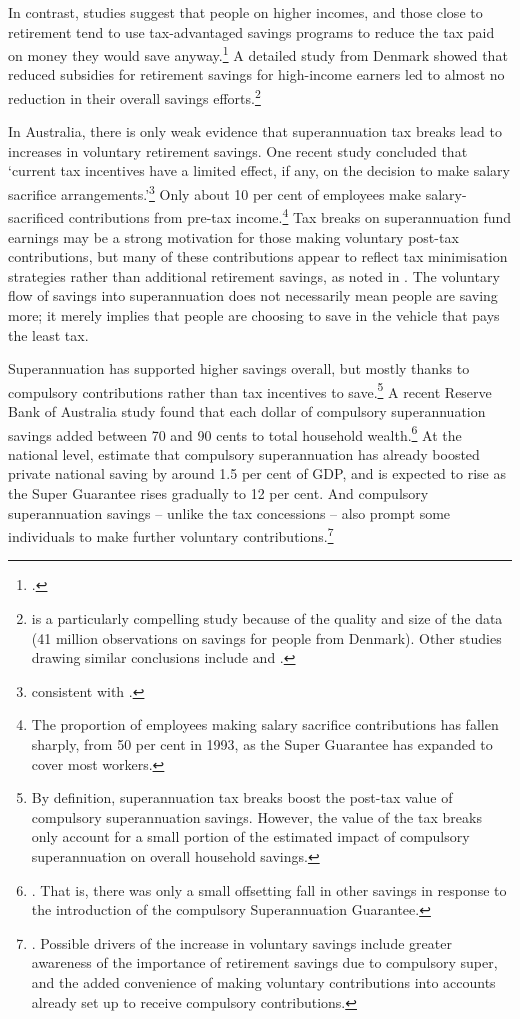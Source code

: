 In contrast, studies suggest that people on higher incomes, and those close to retirement tend to use tax-advantaged savings programs to reduce the tax paid on money they would save anyway.\footcite{AyusoJimenoVillanueva2007} A detailed study from Denmark showed that reduced subsidies for retirement savings for high-income earners led to almost no reduction in their overall savings efforts.\footnote{\textcite{ChettyFriedmanLethPetersenEtAl2014} is a particularly compelling study because of the quality and size of the data (41 million observations on savings for people from Denmark). Other studies drawing similar conclusions include \textcite{EngenGale2000} and \textcite{Benjamin2003}.}

In Australia, there is only weak evidence that superannuation tax breaks lead to increases in voluntary retirement savings. One recent study concluded that ‘current tax incentives have a limited effect, if any, on the decision to make salary sacrifice arrangements.’\footnote{\textcite{Feng2014} consistent with .}
Only about 10 per cent of employees make salary-sacrificed contributions from pre-tax income.\footnote{\textcite{ABS2013t} The proportion of employees making salary sacrifice contributions has fallen sharply, from 50 per cent in 1993, as the Super Guarantee has expanded to cover most workers.}
Tax breaks on superannuation fund earnings may be a strong motivation for those making voluntary post-tax contributions, but many of these contributions appear to reflect tax minimisation strategies rather than additional retirement savings, as noted in . The voluntary flow of savings into superannuation does not necessarily mean people are saving more; it merely implies that people are choosing to save in the vehicle that pays the least tax. 

Superannuation has supported higher savings overall, but mostly thanks to compulsory contributions rather than tax incentives to save.\footnote{By definition, superannuation tax breaks boost the post-tax value of compulsory superannuation savings. However, the value of the tax breaks only account for a small portion of the estimated impact of compulsory superannuation on overall household savings.} 
A recent Reserve Bank of Australia study found that each dollar of compulsory superannuation savings added between 70 and 90 cents to total household wealth.\footnote{\textcite{Connolly2007}. That is, there was only a small offsetting fall in other savings in response to the introduction of the compulsory Superannuation Guarantee.} 
At the national level, \textcite{GruenSoding2011} estimate that compulsory superannuation has already boosted private national saving by around 1.5 per cent of GDP, and is expected to rise as the Super Guarantee rises gradually to 12 per cent. And compulsory superannuation savings – unlike the tax concessions – also prompt some individuals to make further voluntary contributions.\footnote{\textcite[][4]{Connolly2007}. Possible drivers of the increase in voluntary savings include greater awareness of the importance of retirement savings due to compulsory super, and the added convenience of making voluntary contributions into accounts already set up to receive compulsory contributions.}

